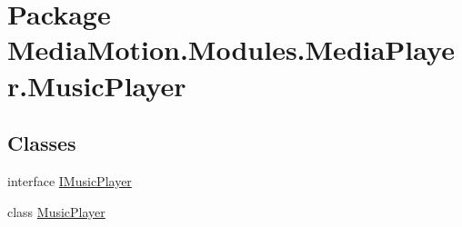 \hypertarget{namespace_media_motion_1_1_modules_1_1_media_player_1_1_music_player}{\section{Package Media\+Motion.\+Modules.\+Media\+Player.\+Music\+Player}
\label{namespace_media_motion_1_1_modules_1_1_media_player_1_1_music_player}
}
\subsection*{Classes}
\begin{DoxyCompactItemize}
\item 
interface \hyperlink{interface_media_motion_1_1_modules_1_1_media_player_1_1_music_player_1_1_i_music_player}{I\+Music\+Player}
\item 
class \hyperlink{class_media_motion_1_1_modules_1_1_media_player_1_1_music_player_1_1_music_player}{Music\+Player}
\end{DoxyCompactItemize}

